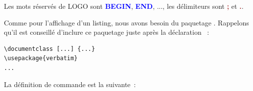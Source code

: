 Les mots réservés de LOGO sont \colorbox{gray!6}{\ttfamily\textcolor{blue}{\bf BEGIN}}, \colorbox{gray!6}{\ttfamily\textcolor{blue}{\bf END}}, ..., les délimiteurs sont \colorbox{gray!6}{\ttfamily\textcolor{brown}{\bf ;}} et \colorbox{gray!6}{\ttfamily\textcolor{brown}{\bf .}}.

Comme pour l'affichage d'un listing, nous avons besoin du paquetage . Rappelons qu'il est conseillé d'inclure ce paquetage juste après la déclaration ~:

{\singlespacing
\begin{verbatim}
\documentclass [...] {...}
\usepackage{verbatim}
...
\end{verbatim}
}

La définition de commande  est la suivante~:







